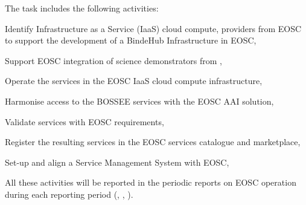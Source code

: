 \begin{task}[
  title=Integration with EOSC,
  id=eosc,
  lead=EGI,
  PM=24,
  wphases={12-48},
  partners={SRL,WTT,XFEL}
]
  The task includes the following activities:
  \begin{compactitem}
  \item Identify Infrastructure as a Service (IaaS) cloud compute,
    providers from EOSC to support the development of a BindeHub
    Infrastructure in EOSC,
  \item Support EOSC integration of science demonstrators from ,
  \item Operate the services in the EOSC IaaS cloud compute infrastructure,
  \item Harmonise access to the BOSSEE services with the EOSC AAI solution,
  \item Validate services with EOSC requirements,
  \item Register the resulting services in the EOSC services catalogue and marketplace,
  \item Set-up and align a Service Management System with EOSC,
  \end{compactitem}

   All these activities will be reported in the periodic reports on EOSC operation
   during each reporting period (, , ).
\end{task}
